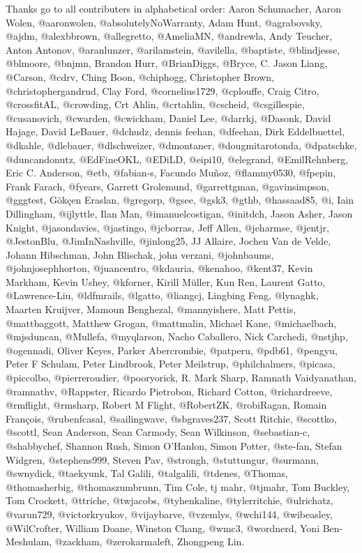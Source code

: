 Thanks go to all contributers in alphabetical order: Aaron Schumacher,
Aaron Wolen, @aaronwolen, @absolutelyNoWarranty, Adam Hunt, @agrabovsky,
@ajdm, @alexbbrown, @allegretto, @AmeliaMN, @andrewla, Andy Teucher,
Anton Antonov, @aranlunzer, @arilamstein, @avilella, @baptiste,
@blindjesse, @blmoore, @bnjmn, Brandon Hurr, @BrianDiggs, @Bryce, C.
Jason Liang, @Carson, @cdrv, Ching Boon, @chiphogg, Christopher Brown,
@christophergandrud, Clay Ford, @cornelius1729, @cplouffe, Craig Citro,
@crossfitAL, @crowding, Crt Ahlin, @crtahlin, @cscheid, @csgillespie,
@cusanovich, @cwarden, @cwickham, Daniel Lee, @darrkj, @Dasonk, David
Hajage, David LeBauer, @dchudz, dennis feehan, @dfeehan, Dirk
Eddelbuettel, @dkahle, @dlebauer, @dlschweizer, @dmontaner,
@dougmitarotonda, @dpatschke, @duncandonutz, @EdFineOKL, @EDiLD,
@eipi10, @elegrand, @EmilRehnberg, Eric C. Anderson, @etb, @fabian-s,
Facundo Muñoz, @flammy0530, @fpepin, Frank Farach, @fyears, Garrett
Grolemund, @garrettgman, @gavinsimpson, @gggtest, Gökçen Eraslan,
@gregorp, @gsee, @gsk3, @gthb, @hassaad85, @i, Iain Dillingham,
@ijlyttle, Ilan Man, @imanuelcostigan, @initdch, Jason Asher, Jason
Knight, @jasondavies, @jastingo, @jcborras, Jeff Allen, @jeharmse,
@jentjr, @JestonBlu, @JimInNashville, @jinlong25, JJ Allaire, Jochen Van
de Velde, Johann Hibschman, John Blischak, john verzani, @johnbaums,
@johnjosephhorton, @juancentro, @kdauria, @kenahoo, @kent37, Kevin
Markham, Kevin Ushey, @kforner, Kirill Müller, Kun Ren, Laurent Gatto,
@Lawrence-Liu, @ldfmrails, @lgatto, @liangcj, Lingbing Feng, @lynaghk,
Maarten Kruijver, Mamoun Benghezal, @mannyishere, Matt Pettis,
@mattbaggott, Matthew Grogan, @mattmalin, Michael Kane, @michaelbach,
@mjsduncan, @Mullefa, @myqlarson, Nacho Caballero, Nick Carchedi,
@nstjhp, @ogennadi, Oliver Keyes, Parker Abercrombie, @patperu, @pdb61,
@pengyu, Peter F Schulam, Peter Lindbrook, Peter Meilstrup,
@philchalmers, @picasa, @piccolbo, @pierreroudier, @pooryorick, R. Mark
Sharp, Ramnath Vaidyanathan, @ramnathv, @Rappster, Ricardo Pietrobon,
Richard Cotton, @richardreeve, @rmflight, @rmsharp, Robert M Flight,
@RobertZK, @robiRagan, Romain François, @rubenfcasal, @sailingwave,
@sbgraves237, Scott Ritchie, @scottko, @scottl, Sean Anderson, Sean
Carmody, Sean Wilkinson, @sebastian-c, @shabbychef, Shannon Rush, Simon
O'Hanlon, Simon Potter, @ste-fan, Stefan Widgren, @stephens999, Steven
Pav, @strongh, @stuttungur, @surmann, @swnydick, @taekyunk, Tal Galili,
@talgalili, @tdenes, @Thomas, @thomasherbig, @thomaszumbrunn, Tim Cole,
tj mahr, @tjmahr, Tom Buckley, Tom Crockett, @ttriche, @twjacobs,
@tyhenkaline, @tylerritchie, @ulrichatz, @varun729, @victorkryukov,
@vijaybarve, @vzemlys, @wchi144, @wibeasley, @WilCrofter, William Doane,
Winston Chang, @wmc3, @wordnerd, Yoni Ben-Meshulam, @zackham,
@zerokarmaleft, Zhongpeng Lin.

